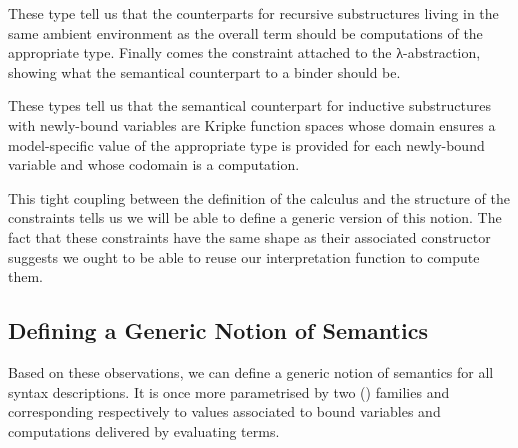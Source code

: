 \noindent\begin{minipage}[t]{0.4\textwidth}
\end{minipage}\begin{minipage}[t]{0.6\textwidth}
  \begin{AgdaSuppressSpace}
  \end{AgdaSuppressSpace}
\end{minipage}

These type tell us that the counterparts for recursive
substructures living in the same ambient environment as
the overall term should be computations of the appropriate
type.
%
Finally comes the constraint attached to the λ-abstraction,
showing what the semantical counterpart to a binder should be.

\noindent\begin{minipage}[t]{0.4\textwidth}
\end{minipage}\begin{minipage}[t]{0.6\textwidth}
\end{minipage}

These types tell us that the semantical counterpart for inductive
substructures with newly-bound variables are Kripke function spaces
whose domain ensures a model-specific value  of the appropriate
type is provided for each newly-bound variable and whose codomain is
a computation.

This tight coupling between the definition of the calculus and the
structure of the  constraints tells us we will be able
to define a generic version of this notion. The fact that these
constraints have the same shape as their associated constructor
suggests we ought to be able to reuse our interpretation function
 to compute them.

\subsection{Defining a Generic Notion of Semantics}

Based on these observations, we can define a generic notion of semantics
for all syntax descriptions. It is once more parametrised by two
{()} families  and  corresponding
respectively to values associated to bound variables and computations
delivered by evaluating terms.

